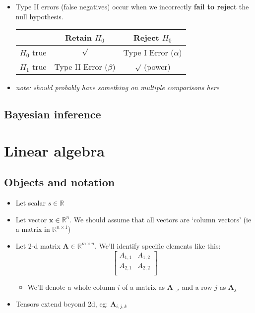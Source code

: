 \documentclass{article}
\begin{document}
\begin{multicols*}{2}
\begin{itemize}
    \item Type II errors (false negatives) occur when we incorrectly \textbf{fail to reject} the null hypothesis.
\begin{center}
\begin{tabular}{l|cc}
  & \textsf{Retain} $H_0$ & \textsf{Reject} $H_0$ \\
  \hline
  $H_0$ \textsf{true} & $\surd$ & Type I Error ($\alpha$)\\
  $H_1$ \textsf{true} & Type II Error ($\beta$) &
  $\surd$ (power) \\
\end{tabular}
\end{center}
  \item \emph{note: should probably have something on multiple comparisons here}
\end{itemize}

\subsection{Bayesian inference}

\section{Linear algebra}
\subsection{Objects and notation}
\begin{itemize}
    \item Let scalar $s \in \mathbb{R}$
    \item Let vector $\bm{x} \in \mathbb{R}^n$. We should assume that all vectors are `column vectors' (ie a matrix in $\mathbb{R}^{n \times 1}$)
    \item Let 2-d matrix $\bm{A} \in \mathbb{R}^{m \times n}$. We'll identify specific elements like this:
    $$\begin{bmatrix}
    A_{1,1} & A_{1,2} \\
    A_{2,1} & A_{2,2} \\
    \end{bmatrix}$$
    \begin{itemize}
        \item We'll denote a whole column $i$ of a matrix as $\bm{A}_{:,i}$ and a row $j$ as $\bm{A}_{j, :}$
    \end{itemize}
    \item Tensors extend beyond 2d, eg: $\textbf{A}_{i,j,k}$
\end{itemize}

\end{multicols*}
\end{document}

